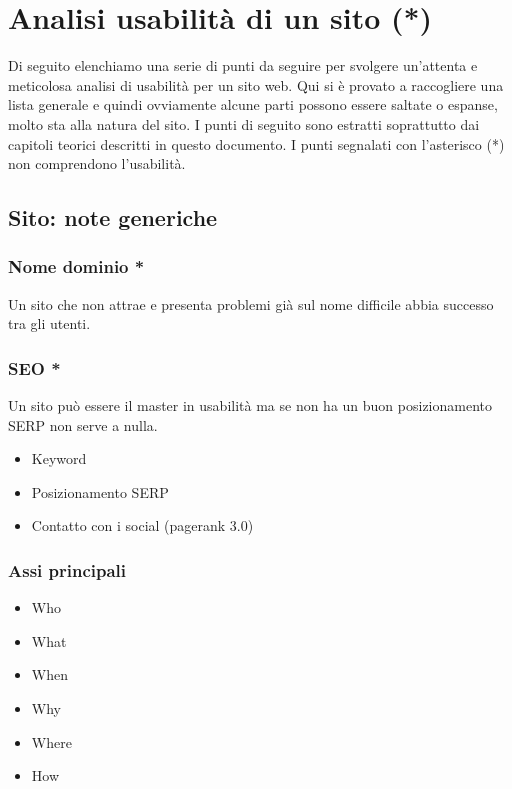 
\chapter{Analisi usabilità di un sito (*)}
	Di seguito elenchiamo una serie di punti da seguire per svolgere un'attenta e meticolosa analisi di usabilità per un sito web. Qui si  è provato a raccogliere una lista generale e quindi ovviamente alcune parti possono essere saltate o espanse, molto sta alla natura del sito.
	I punti di seguito sono estratti soprattutto dai capitoli teorici descritti in questo documento. I punti segnalati con l'asterisco (*) non comprendono l'usabilità.
	
	\section{Sito: note generiche}

			\subsection*{Nome dominio *} 
				Un sito che non attrae e presenta problemi già sul nome difficile abbia successo tra gli utenti.
				
			\subsection*{SEO *} 
				Un sito può essere il master in usabilità ma se non ha un buon posizionamento SERP non serve a nulla.
				\begin{itemize}
					\item Keyword
					\item Posizionamento SERP
					\item Contatto con i social (pagerank 3.0)
				\end{itemize}
				
			\subsection*{Assi principali}
				\begin{itemize}
					\item Who
					\item What
					\item When
					\item Why
					\item Where
					\item How
				\end{itemize}
				
